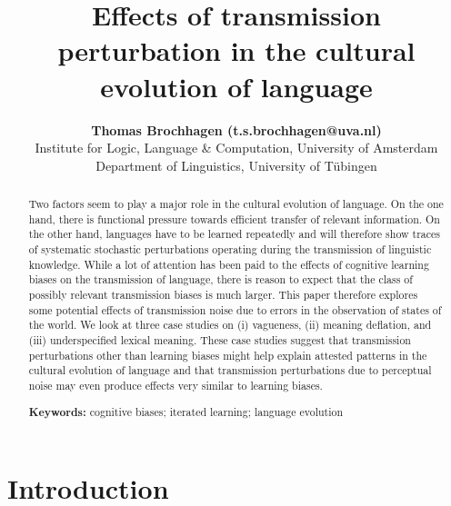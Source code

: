 \documentclass[10pt,a4paper]{article}
\title{Effects of transmission perturbation in the cultural evolution of language}
\author{{\large \bf Thomas Brochhagen (t.s.brochhagen@uva.nl)}\\
  Institute for Logic, Language \& Computation, University of Amsterdam
  \AND {\large \bf Michael Franke (mchfranke@gmail.com)} \\
  Department of Linguistics, University of T\"{u}bingen}
\begin{document}
\maketitle

\begin{abstract}
  Two factors seem to play a major role in the cultural evolution of language. On the one
  hand, there is functional pressure towards efficient transfer of relevant information. On the
  other hand, languages have to be learned repeatedly and will therefore show traces of
  systematic stochastic perturbations operating during the transmission of linguistic
  knowledge. While a lot of attention has been paid to the effects of cognitive learning biases
  on the transmission of language, there is reason to expect that the class of possibly
  relevant transmission biases is much larger. This paper therefore explores some potential
  effects of transmission noise due to errors in the observation of states of the world. We
  look at three case studies on (i) vagueness, (ii) meaning deflation, and (iii) underspecified
  lexical meaning. These case studies suggest that transmission perturbations other than
  learning biases might help explain attested patterns in the cultural evolution of language
  and that transmission perturbations due to perceptual noise may even produce effects very
  similar to learning biases.

\textbf{Keywords:} 
cognitive biases; iterated learning; language evolution  
\end{abstract}


\section{Introduction}
\end{document}
